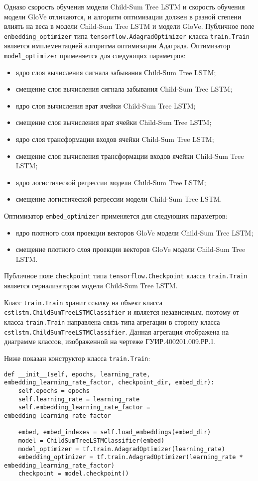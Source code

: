 Однако скорость обучения модели Child-Sum Tree LSTM и скорость обучения модели GloVe отличаются, и алгоритм оптимизации должен в разной степени влиять на веса в модели Child-Sum Tree LSTM и модели GloVe. Публичное поле \texttt{enbedding\_optimizer} типа \texttt{tensorflow.AdagradOptimizer} класса \texttt{train.Train} является имплементацией алгоритма оптимизации Ада\-града. Оптимизатор \texttt{model\_optimizer} применяется для следующих параметров:
\begin{itemize}
\item ядро слоя вычисления сигнала забывания Сhild-Sum Tree LSTM\@;
\item смещение слоя вычисления сигнала забывания Child-Sum Tree LSTM\@;
\item ядро слоя вычисления врат ячейки Child-Sum Tree LSTM\@;
\item смещение слоя вычисления врат ячейки Child-Sum Tree LSTM\@;
\item ядро слоя трансформации входов ячейки Child-Sum Tree LSTM\@;
\item смещение слоя вычисления трансформации входов ячейки Child-Sum Tree LSTM\@;
\item ядро логистической регрессии модели Child-Sum Tree LSTM\@;
\item смещение логистической регрессии модели Child-Sum Tree LSTM\@.
\end{itemize}
Оптимизатор \texttt{embed\_optimizer} применяется для следующих параметров:
\begin{itemize}
\item ядро плотного слоя проекции векторов GloVe модели Child-Sum Tree LSTM\@;
\item смещение плотного слоя проекции векторов GloVe модели Child-Sum Tree LSTM\@.
\end{itemize}

Публичное поле \texttt{checkpoint} типа \texttt{tensorflow.Checkpoint} класса \texttt{tra\-in.Train} является сериализатором модели Child-Sum Tree LSTM\@.

Класс \texttt{train.Train} хранит ссылку на объект класса \texttt{cstlstm.ChildSum\-TreeLSTMClassifier} и является независимым, поэтому от класса \texttt{train.Tra\-in} направлена связь типа агрегации в сторону класса \texttt{cstlstm.ChildSumTree\-LSTMClassifier}. Данная агрегация отображена на диаграмме классов, изображенной на чертеже ГУИР.400201.009.РР.1.

Ниже показан конструктор класса \texttt{train.Train}:
\medskip
\begin{lstlisting}[style=Python]
  def __init__(self, epochs, learning_rate, embedding_learning_rate_factor, checkpoint_dir, embed_dir):
    self.epochs = epochs
    self.learning_rate = learning_rate
    self.embedding_learning_rate_factor = embedding_learning_rate_factor

    embed, embed_indexes = self.load_embeddings(embed_dir)
    model = ChildSumTreeLSTMClassifier(embed)
    model_optimizer = tf.train.AdagradOptimizer(learning_rate)
    embedding_optimizer = tf.train.AdagradOptimizer(learning_rate * embedding_learning_rate_factor)
    checkpoint = model.checkpoint()
\end{lstlisting}
\medskip

